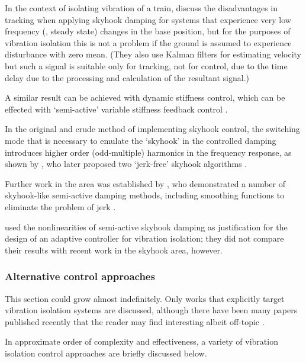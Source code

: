 In the context of isolating vibration of a train, \textcite{li1999} discuss the disadvantages in tracking when applying skyhook damping for systems that experience very low frequency (\ie, steady state) changes in the base position, but for the purposes of vibration isolation this is not a problem if the ground is assumed to experience disturbance with zero mean.
(They also use Kalman filters for estimating velocity but such a signal is suitable only for tracking, not for control, due to the time delay due to the processing and calculation of the resultant signal.)

A similar result  can be achieved with dynamic stiffness control, which can be effected with `semi-active' variable stiffness feedback control \cite{leavitt2007}.

In the original and crude method of implementing skyhook control, the switching mode that is necessary to emulate the `skyhook' in the controlled damping introduces higher order (odd-multiple) harmonics in the frequency response, as shown by \textcite{ahmadian2001}, who later proposed two `jerk-free' skyhook algorithms \cite{ahmadian2004}.

Further work in the area was established by \textcite{liu2002}, who demonstrated a number of skyhook-like semi-active damping methods, including smoothing functions to eliminate the problem of jerk
\cite{liu2005}.

\textcite{song2007} used the nonlinearities of semi-active skyhook damping as justification for the design of an adaptive controller for vibration isolation; they did not compare their results with recent work in the skyhook area, however.


\subsubsection{Alternative control approaches}

This section could grow almost indefinitely. Only works that explicitly target vibration isolation systems are discussed, although there have been many papers published recently that the reader may find interesting albeit off-topic \cite{chatterjee2008,mottershead2008}.

In approximate order of complexity and effectiveness, a variety of vibration isolation control approaches are briefly discussed below.

